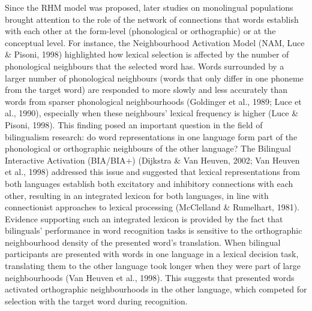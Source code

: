 \documentclass[
  english,
  man,floatsintext]{apa7}
\begin{document}
Since the RHM model was proposed, later studies on monolingual populations brought attention to the role of the network of connections that words establish with each other at the form-level (phonological or orthographic) or at the conceptual level. For instance, the Neighbourhood Activation Model (NAM, Luce \& Pisoni, 1998) highlighted how lexical selection is affected by the number of phonological neighbours that the selected word has. Words surrounded by a larger number of phonological neighbours (words that only differ in one phoneme from the target word) are responded to more slowly and less accurately than words from sparser phonological neighbourhoods (Goldinger et al., 1989; Luce et al., 1990), especially when these neighbours' lexical frequency is higher (Luce \& Pisoni, 1998). This finding posed an important question in the field of bilingualism research: do word representations in one language form part of the phonological or orthographic neighbours of the other language? The Bilingual Interactive Activation (BIA/BIA+) (Dijkstra \& Van Heuven, 2002; Van Heuven et al., 1998) addressed this issue and suggested that lexical representations from both languages establish both excitatory and inhibitory connections with each other, resulting in an integrated lexicon for both languages, in line with connectionist approaches to lexical processing (McClelland \& Rumelhart, 1981). Evidence supporting such an integrated lexicon is provided by the fact that bilinguals' performance in word recognition tasks is sensitive to the orthographic neighbourhood density of the presented word's translation. When bilingual participants are presented with words in one language in a lexical decision task, translating them to the other language took longer when they were part of large neighbourhoods (Van Heuven et al., 1998). This suggests that presented words activated orthographic neighbourhoods in the other language, which competed for selection with the target word during recognition.
\end{document}

